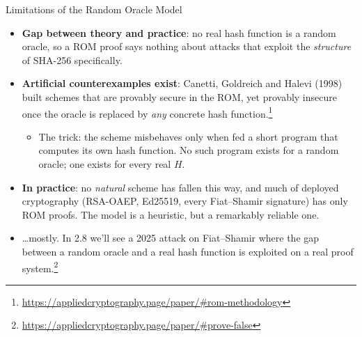 \ifdefined\PRESENTATION\else\PassOptionsToClass{handout}{beamer}\fi\documentclass[aspectratio=169, lualatex]{beamer}
\begin{document}
\begin{frame}{Limitations of the Random Oracle Model}
	\begin{itemize}
		\item \textbf{Gap between theory and practice}: no real hash function is a random oracle, so a ROM proof says nothing about attacks that exploit the \emph{structure} of SHA-256 specifically.
		\item \textbf{Artificial counterexamples exist}: Canetti, Goldreich and Halevi (1998) built schemes that are provably secure in the ROM, yet provably insecure once the oracle is replaced by \emph{any} concrete hash function.\footnote{\url{https://appliedcryptography.page/paper/\#rom-methodology}}
		      \begin{itemize}
			      \item The trick: the scheme misbehaves only when fed a short program that computes its own hash function. No such program exists for a random oracle; one exists for every real $H$.
		      \end{itemize}
		\item \textbf{In practice}: no \emph{natural} scheme has fallen this way, and much of deployed cryptography (RSA-OAEP, Ed25519, every Fiat--Shamir signature) has only ROM proofs. The model is a heuristic, but a remarkably reliable one.
		\item \ldots mostly. In 2.8 we'll see a 2025 attack on Fiat--Shamir where the gap between a random oracle and a real hash function is exploited on a real proof system.\footnote{\url{https://appliedcryptography.page/paper/\#prove-false}}
	\end{itemize}
\end{frame}
\end{document}
